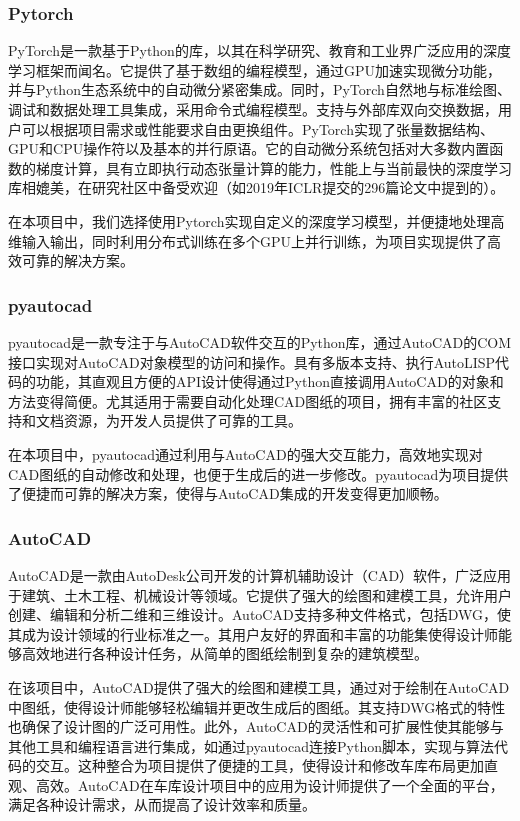 \subsubsection{Pytorch}
PyTorch是一款基于Python的库，以其在科学研究、教育和工业界广泛应用的深度学习框架而闻名。它提供了基于数组的编程模型，通过GPU加速实现微分功能，并与Python生态系统中的自动微分紧密集成。同时，PyTorch自然地与标准绘图、调试和数据处理工具集成，采用命令式编程模型。支持与外部库双向交换数据，用户可以根据项目需求或性能要求自由更换组件。PyTorch实现了张量数据结构、GPU和CPU操作符以及基本的并行原语。它的自动微分系统包括对大多数内置函数的梯度计算，具有立即执行动态张量计算的能力，性能上与当前最快的深度学习库相媲美，在研究社区中备受欢迎（如2019年ICLR提交的296篇论文中提到的\cite{paszke2019pytorch}）。

在本项目中，我们选择使用Pytorch实现自定义的深度学习模型，并便捷地处理高维输入输出，同时利用分布式训练在多个GPU上并行训练，为项目实现提供了高效可靠的解决方案。
\subsubsection{pyautocad}
pyautocad\cite{shahzad2023implementing}是一款专注于与AutoCAD软件交互的Python库，通过AutoCAD的COM接口实现对AutoCAD对象模型的访问和操作。具有多版本支持、执行AutoLISP代码的功能，其直观且方便的API设计使得通过Python直接调用AutoCAD的对象和方法变得简便。尤其适用于需要自动化处理CAD图纸的项目，拥有丰富的社区支持和文档资源，为开发人员提供了可靠的工具。

在本项目中，pyautocad通过利用与AutoCAD的强大交互能力，高效地实现对CAD图纸的自动修改和处理，也便于生成后的进一步修改。pyautocad为项目提供了便捷而可靠的解决方案，使得与AutoCAD集成的开发变得更加顺畅。
\subsubsection{AutoCAD}
AutoCAD是一款由AutoDesk公司开发的计算机辅助设计（CAD）软件，广泛应用于建筑、土木工程、机械设计等领域。它提供了强大的绘图和建模工具，允许用户创建、编辑和分析二维和三维设计。AutoCAD支持多种文件格式，包括DWG，使其成为设计领域的行业标准之一。其用户友好的界面和丰富的功能集使得设计师能够高效地进行各种设计任务，从简单的图纸绘制到复杂的建筑模型。

在该项目中，AutoCAD提供了强大的绘图和建模工具，通过对于绘制在AutoCAD中图纸，使得设计师能够轻松编辑并更改生成后的图纸。其支持DWG格式的特性也确保了设计图的广泛可用性。此外，AutoCAD的灵活性和可扩展性使其能够与其他工具和编程语言进行集成，如通过pyautocad连接Python脚本，实现与算法代码的交互。这种整合为项目提供了便捷的工具，使得设计和修改车库布局更加直观、高效。AutoCAD在车库设计项目中的应用为设计师提供了一个全面的平台，满足各种设计需求，从而提高了设计效率和质量。
